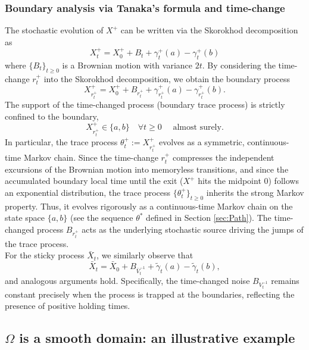 \documentclass[10pt,a4paper]{article}
\numberwithin{equation}{section}
\theoremstyle{plain}
\theoremstyle{remark}
\begin{document}
\subsubsection{Boundary analysis via Tanaka's formula and time-change}
\label{sec:further}


The stochastic evolution of $X^+$ can be written via the Skorokhod decomposition as
\begin{equation*}
X^+_t = X^+_0 + B_t + \gamma^+_t(a) - \gamma^+_t(b)
\end{equation*}
where $\{B_t\}_{t \geq 0}$ is a Brownian motion with variance $2t$. By considering the time-change $r^+_t$ into the Skorokhod decomposition, we obtain the boundary process
\begin{equation}
X^+_{r^+_t} = X^+_0 + B_{r^+_t} + \gamma^+_{r^+_t}(a) - \gamma^+_{r^+_t}(b).
\label{eq:time_changed_Skorokhod}
\end{equation}
The support of the time-changed process (boundary trace process) is strictly confined to the boundary,
\begin{equation*}
X^+_{r^+_t} \in \{a, b\} \quad \forall t \geq 0 \quad \textrm{ almost surely.}
\end{equation*}
In particular, the trace process $\theta^+_t := X^+_{r^+_t}$ evolves as a symmetric, continuous-time Markov chain. Since the time-change $r_{t}^{+}$ compresses the independent excursions of the Brownian motion into memoryless transitions, and since the accumulated boundary local time until the exit ($X^+$ hits the midpoint $0$) follows an exponential distribution, the trace process $\{\theta^+_t\}_{t \geq 0}$ inherits the strong Markov property. Thus, it evolves rigorously as a continuous-time Markov chain on the state space $\{a, b\}$ (see the sequence $\theta^*$ defined in Section \ref{sec:Path}). The time-changed process $B_{r^+_t}$ acts as the underlying stochastic source driving the jumps of the trace process. \\


For the sticky process $\bar{X}_t$, we similarly observe that
\begin{equation}
\bar{X}_t = \bar{X}_0 + B_{\bar{V}^{-1}_t} + \tilde{\gamma}_t(a) - \tilde{\gamma}_t(b),
\end{equation}  
and analogous arguments hold. Specifically, the time-changed noise $B_{V^{-1}_t}$ remains constant precisely when the process is trapped at the boundaries, reflecting the presence of positive holding times.


\subsection{$\Omega$ is a smooth domain: an illustrative example}
\label{sec:OmegaSmooth}
\end{document}
